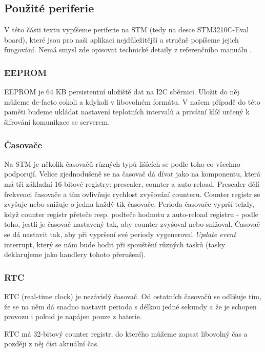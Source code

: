 
\subsection{Použité periferie}
V této části textu vypíšeme periferie na STM (tedy na desce STM3210C-Eval board), které jsou
pro naši aplikaci nejdůležitější a stručně popíšeme jejich fungování.
Nemá smysl zde opisovat technické detaily z referenčního manuálu \cite{ReferenceManual}.

\subsubsection{EEPROM}
EEPROM je 64 KB persistentní uložiště dat na I2C sběrnici.
Uložit do něj můžeme de-facto cokoli a kdykoli v libovolném formátu.
V našem případě do této paměti budeme ukládat nastavení teplotních intervalů a privátní klíč
určený k šifrování komunikace se serverem.

\subsubsection{Časovače}
Na STM je několik časovačů různých typů lišících se podle toho co všechno podporují.
Velice zjednodušeně se na časovač dá dívat jako na komponentu, která má tři základní
16-bitové registry: prescaler, counter a auto-reload.
Prescaler dělí frekvenci časovače a tím ovlivňuje rychlost zvyšování counteru.
Counter registr se zvyšuje nebo snižuje o jedna každý tik časovače.
Perioda časovače vyprší tehdy, když counter registr přeteče resp. podteče hodnotu
z auto-reload registru - podle toho, jestli je časovač nastavený tak, aby counter zvyšoval nebo snižoval.
Časovač se dá nastavit tak, aby při vypršení své periody vygeneroval \emph{Update event} interrupt,
který se nám bude hodit při spouštění různých tasků (tasky deklarujeme jako handlery tohoto přerušení).

\subsubsection{RTC}
RTC (real-time clock) je nezávislý časovač.
Od ostatních časovačů se odlišuje tím, že se na něm dá snadno nastavit perioda
s délkou jedné sekundy a že je schopen provozu i pokud je napájen pouze z
baterie.

RTC má 32-bitový counter registr, do kterého můžeme zapsat libovolný čas a později z
něj číst aktuální čas.

